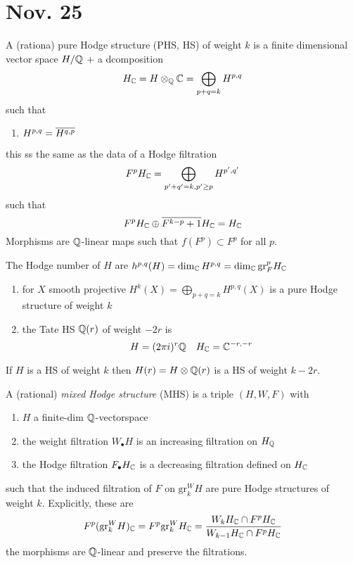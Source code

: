 \documentclass[12pt]{article}
\renewcommand{\gr}{\mathrm{gr}}
\begin{document}
\section{Nov. 25}


\begin{defn}
A (rationa) pure Hodge structure (PHS, HS) of weight $k$ is a finite dimensional vector space $H / \mathbb{Q}$ + a dcomposition 
\[ H_{\mathbb{C}} = H \otimes_{\mathbb{Q}} \mathbb{C} = \bigoplus_{p + q = k} H^{p,q} \]
such that
\begin{enumerate}
\item $H^{p,q} = \overline{H^{q,p}}$
\end{enumerate}
this ss the same as the data of a Hodge filtration 
\[ F^p H_{\mathbb{C}} = \bigoplus_{p' + q' = k, p' \ge p} H^{p',q'} \] 
such that 
\[ F^p H_{\mathbb{C}} \oplus \overline{F^{k-p}+1} H_{\mathbb{C}} = H_{\mathbb{C}} \]
Morphisms are $\mathbb{Q}$-linear maps such that $f(F^p) \subset F^p$ for all $p$.
\end{defn}

\begin{defn}
The Hodge number of $H$ are $h^{p,q}(H) = \dim_{\CC} H^{p,q} = \dim_{\CC} \gr_F^p H_{\CC}$
\end{defn}

\begin{example}
\begin{enumerate}
\item for $X$ smooth projective $H^k(X) = \bigoplus_{p + q = k} H^{p,q}(X)$ is a pure Hodge structure of weight $k$
\item the Tate HS $\mathbb{Q}(r)$ of weight $-2r$ is 
\[ H = (2 \pi i)^r \mathbb{Q} \quad H_{\mathbb{C}} = \mathbb{C}^{-r,-r} \]
\end{enumerate}
If $H$ is a HS of weight $k$ then $H(r) = H \otimes \mathbb{Q}(r)$ is a HS of weight $k-2r$.
\end{example}

\begin{defn}
A (rational) \textit{mixed Hodge structure} (MHS) is a triple $(H, W, F)$ with
\begin{enumerate}
\item $H$ a finite-dim $\mathbb{Q}$-vectorspace
\item the weight filtration $W_\bullet H$ is an increasing filtration on $H_{\mathbb{Q}}$
\item the Hodge filtration $F_\bullet H_{\mathbb{C}}$ is a decreasing filtration defined on $H_{\mathbb{C}}$ 
\end{enumerate}
such that the induced filtration of $F$ on $\gr^W_k H$ are pure Hodge structures of weight $k$. Explicitly, these are
\[ F^p( \gr_k^W H)_{\CC} = F^p \gr_k^W H_{\CC} = \frac{W_k H_{\CC} \cap F^p H_{\CC}}{W_{k-1} H_{\CC} \cap F^p H_{\CC}} \]
the morphisms are $\mathbb{Q}$-linear and preserve the filtrations. 
\end{defn}
\end{document}
